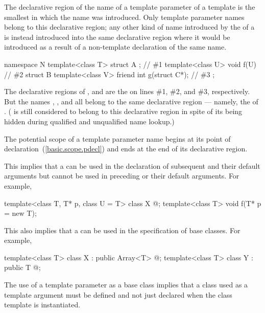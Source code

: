 \pnum
The declarative region of the name of a template parameter of a template is the smallest
 in which the name was introduced. Only template
parameter names belong to this declarative region; any other kind of name introduced by
the  of a  is instead
introduced into the same declarative region where it would be introduced as a result of
a non-template declaration of the same name. \begin{example}

\begin{codeblock}
namespace N {
  template<class T> struct A { };               // \#1
  template<class U> void f(U) { }               // \#2
  struct B {
    template<class V> friend int g(struct C*);  // \#3
  };
}
\end{codeblock}

The declarative regions of ,  and  are the
 on lines \#1, \#2, and \#3,
respectively. But the names , ,  and  all belong to
the same declarative region --- namely, the  of .
( is still considered to belong to this declarative region in spite of its
being hidden during qualified and unqualified name lookup.)
\end{example}

\pnum
The potential scope of a template parameter name begins at its point of
declaration~(\ref{basic.scope.pdecl}) and ends at the end of its declarative region.
\begin{note} This implies that a  can be used in the
declaration of subsequent  and their default
arguments but cannot be used in preceding  or their
default arguments. For example,

\begin{codeblock}
template<class T, T* p, class U = T> class X { @\commentellip@ };
template<class T> void f(T* p = new T);
\end{codeblock}

This also implies that a  can be used in the
specification of base classes. For example,

\begin{codeblock}
template<class T> class X : public Array<T> { @\commentellip@ };
template<class T> class Y : public T { @\commentellip@ };
\end{codeblock}

The use of a template parameter as a base class implies that a class used as a template
argument must be defined and not just declared when the class template is instantiated.
\end{note}

